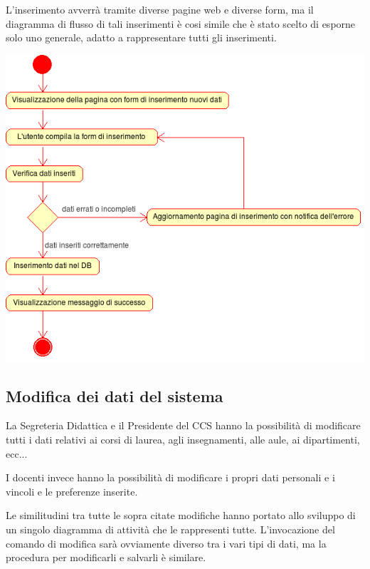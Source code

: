 \documentclass[11pt,a4paper]{article}
\begin{document}
L'inserimento avverrà tramite diverse pagine web e diverse form, ma il diagramma di flusso di tali inserimenti è cosi simile che è stato scelto di esporne solo uno generale, adatto a rappresentare tutti gli inserimenti.
\begin{center}
 \includegraphics[scale=0.85]{images/inserimento_dati.png}
\end{center}

\newpage
\subsection{Modifica dei dati del sistema}
La Segreteria Didattica e il Presidente del CCS hanno la possibilità di modificare tutti i dati relativi ai corsi di laurea, agli insegnamenti, alle aule, ai dipartimenti, ecc...

I docenti invece hanno la possibilità di modificare i propri dati personali e i vincoli e le preferenze inserite.

Le similitudini tra tutte le sopra citate modifiche hanno portato allo sviluppo di un singolo diagramma di attività che le rappresenti tutte. L'invocazione del comando di modifica sarà ovviamente diverso tra i vari tipi di dati, ma la procedura per modificarli e salvarli è similare.
\end{document}
